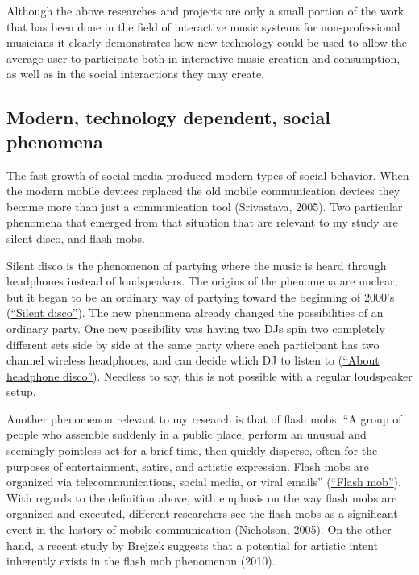 Although the above researches and projects are only a small portion of the work that has been done in the field of interactive music systems for non-professional musicians it clearly demonstrates how new technology could be used to allow the average user to participate both in interactive music creation and consumption, as well as in the social interactions they may create.

\subsection{Modern, technology dependent, social phenomena}


The fast growth of social media produced modern types of social behavior. When the modern mobile devices replaced the old mobile communication devices they became more than just a communication tool (Srivastava, 2005). Two particular phenomena that emerged from that situation that are relevant to my study are silent disco, and flash mobs.

Silent disco is the phenomenon of partying where the music is heard through headphones instead of loudspeakers. The origins of the phenomena are unclear, but it began to be an ordinary way of partying toward the beginning of 2000's (\href{http://en.wikipedia.org/wiki/Silent_disco}{``Silent disco''}). The new phenomena already changed the possibilities of an ordinary party. One new possibility was having two DJs spin two completely different sets side by side at the same party where each participant has two channel wireless headphones, and can decide which DJ to listen to (\href{http://headphonedisco.com/about.php}{``About headphone disco''}). Needless to say, this is not possible with a regular loudspeaker setup.

Another phenomenon relevant to my research is that of flash mobs: ``A group of people who assemble suddenly in a public place, perform an unusual and seemingly pointless act for a brief time, then quickly disperse, often for the purposes of entertainment, satire, and artistic expression. Flash mobs are organized via telecommunications, social media, or viral emails'' (\href{http://en.wikipedia.org/wiki/Flash_mob}{``Flash mob''}). With regards to the definition above, with emphasis on the way flash mobs are organized and executed, different researchers see the flash mobs as a significant event in the history of mobile communication (Nicholson, 2005). On the other hand, a recent study by Brejzek suggests that a potential for artistic intent inherently exists in the flash mob phenomenon (2010).

